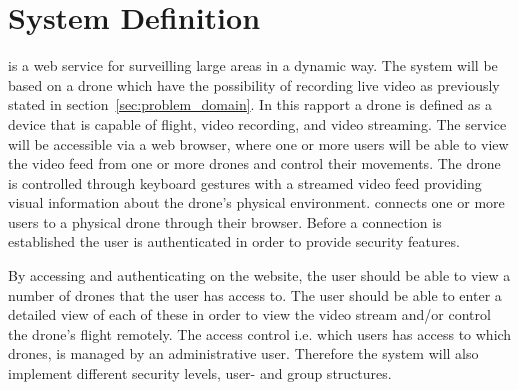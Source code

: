 \section{System Definition}
\projectname{} is a web service for surveilling large areas in a dynamic way. 
The system will be based on a drone which have the possibility of recording live video as previously stated in section~\ref{sec:problem_domain}.
In this rapport a drone is defined as a device that is capable of flight, video recording, and video streaming.
The service will be accessible via a web browser, where one or more users will be able to view the video feed from one or more drones and control their movements. 
The drone is controlled through keyboard gestures with a streamed video feed providing visual information about the drone's physical environment. 
\projectname{} connects one or more users to a physical drone through their browser. 
Before a connection is established the user is authenticated in order to provide security features.

By accessing and authenticating on the website, the user should be able to view a number of drones that the user has access to.
The user should be able to enter a detailed view of each of these in order to view the video stream and/or control the drone's flight remotely. 
The access control i.e. which users has access to which drones, is managed by an administrative user.
Therefore the system will also implement different security levels, user- and group structures. 
